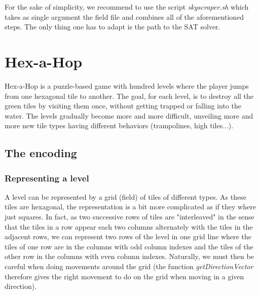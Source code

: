 \documentclass[a4paper, 12pt, titlepage]{article}
\begin{document}
For the sake of simplicity, we recommend to use the script \emph{skyscraper.sh} which takes as single argument the field file and combines all of the aforementioned steps. The only thing one has to adapt is the path to the SAT solver.



\section{Hex-a-Hop}
Hex-a-Hop is a puzzle-based game with hundred levels where the player jumps from
one hexagonal tile to another. The goal, for each level, is to destroy all the
green tiles by visiting them once, without getting trapped or falling into the
water. The levels gradually become more and more difficult, unveiling more and
more new tile types having different behaviors (trampolines, high tiles...).

\subsection{The encoding}

\subsubsection{Representing a level}
A level can be represented by a grid (field) of tiles of different types. As
these tiles are hexagonal, the representation is a bit more complicated as if
they where just squares. In fact, as two successive rows of tiles are
"interleaved" in the sense that the tiles in a row appear each two columns
alternately with the tiles in the adjacent rows, we can represent two rows of
the level in one grid line where the tiles of one row are in the columns with
odd column indexes and the tiles of the other row in the columns with even
column indexes. Naturally, we must then be careful when doing movements around
the grid (the function {\em getDirectionVector} therefore gives the right
movement to do on the grid when moving in a given direction).
\end{document}
